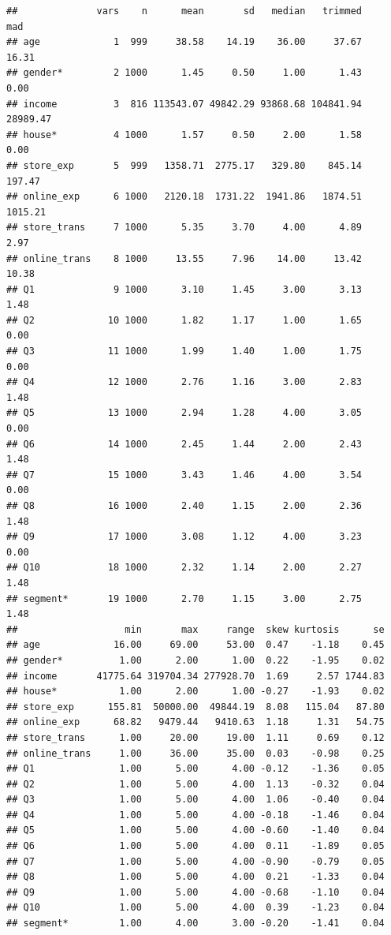 \documentclass[]{book}
\theoremstyle{definition}
\theoremstyle{definition}
\theoremstyle{remark}
\begin{document}
\begin{verbatim}
##              vars    n      mean       sd   median   trimmed      mad
## age             1  999     38.58    14.19    36.00     37.67    16.31
## gender*         2 1000      1.45     0.50     1.00      1.43     0.00
## income          3  816 113543.07 49842.29 93868.68 104841.94 28989.47
## house*          4 1000      1.57     0.50     2.00      1.58     0.00
## store_exp       5  999   1358.71  2775.17   329.80    845.14   197.47
## online_exp      6 1000   2120.18  1731.22  1941.86   1874.51  1015.21
## store_trans     7 1000      5.35     3.70     4.00      4.89     2.97
## online_trans    8 1000     13.55     7.96    14.00     13.42    10.38
## Q1              9 1000      3.10     1.45     3.00      3.13     1.48
## Q2             10 1000      1.82     1.17     1.00      1.65     0.00
## Q3             11 1000      1.99     1.40     1.00      1.75     0.00
## Q4             12 1000      2.76     1.16     3.00      2.83     1.48
## Q5             13 1000      2.94     1.28     4.00      3.05     0.00
## Q6             14 1000      2.45     1.44     2.00      2.43     1.48
## Q7             15 1000      3.43     1.46     4.00      3.54     0.00
## Q8             16 1000      2.40     1.15     2.00      2.36     1.48
## Q9             17 1000      3.08     1.12     4.00      3.23     0.00
## Q10            18 1000      2.32     1.14     2.00      2.27     1.48
## segment*       19 1000      2.70     1.15     3.00      2.75     1.48
##                   min       max     range  skew kurtosis      se
## age             16.00     69.00     53.00  0.47    -1.18    0.45
## gender*          1.00      2.00      1.00  0.22    -1.95    0.02
## income       41775.64 319704.34 277928.70  1.69     2.57 1744.83
## house*           1.00      2.00      1.00 -0.27    -1.93    0.02
## store_exp      155.81  50000.00  49844.19  8.08   115.04   87.80
## online_exp      68.82   9479.44   9410.63  1.18     1.31   54.75
## store_trans      1.00     20.00     19.00  1.11     0.69    0.12
## online_trans     1.00     36.00     35.00  0.03    -0.98    0.25
## Q1               1.00      5.00      4.00 -0.12    -1.36    0.05
## Q2               1.00      5.00      4.00  1.13    -0.32    0.04
## Q3               1.00      5.00      4.00  1.06    -0.40    0.04
## Q4               1.00      5.00      4.00 -0.18    -1.46    0.04
## Q5               1.00      5.00      4.00 -0.60    -1.40    0.04
## Q6               1.00      5.00      4.00  0.11    -1.89    0.05
## Q7               1.00      5.00      4.00 -0.90    -0.79    0.05
## Q8               1.00      5.00      4.00  0.21    -1.33    0.04
## Q9               1.00      5.00      4.00 -0.68    -1.10    0.04
## Q10              1.00      5.00      4.00  0.39    -1.23    0.04
## segment*         1.00      4.00      3.00 -0.20    -1.41    0.04
\end{verbatim}
\end{document}
